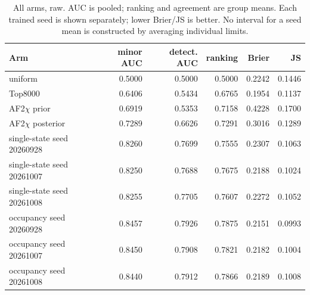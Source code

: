 \documentclass[10pt,a4paper]{article}
\begin{document}
\begin{table}[!htbp]
\centering
\caption{All arms, raw. AUC is pooled; ranking and agreement are group means. Each trained seed is shown separately; lower Brier/JS is better. No interval for a seed mean is constructed by averaging individual limits.}
\label{tab:afarmsraw}
\small\setlength{\tabcolsep}{4pt}
\begin{tabular}{@{}lrrrrr@{}}
\toprule
Arm & minor AUC & detect. AUC & ranking & Brier & JS \\
\midrule
uniform & 0.5000 & 0.5000 & 0.5000 & 0.2242 & 0.1446 \\
Top8000 & 0.6406 & 0.5434 & 0.6765 & 0.1954 & 0.1137 \\
AF2$\chi$ prior & 0.6919 & 0.5353 & 0.7158 & 0.4228 & 0.1700 \\
AF2$\chi$ posterior & 0.7289 & 0.6626 & 0.7291 & 0.3016 & 0.1289 \\
single-state seed 20260928 & 0.8260 & 0.7699 & 0.7555 & 0.2307 & 0.1063 \\
single-state seed 20261007 & 0.8250 & 0.7688 & 0.7675 & 0.2188 & 0.1024 \\
single-state seed 20261008 & 0.8255 & 0.7705 & 0.7607 & 0.2272 & 0.1052 \\
occupancy seed 20260928 & 0.8457 & 0.7926 & 0.7875 & 0.2151 & 0.0993 \\
occupancy seed 20261007 & 0.8450 & 0.7908 & 0.7821 & 0.2182 & 0.1004 \\
occupancy seed 20261008 & 0.8440 & 0.7912 & 0.7866 & 0.2189 & 0.1008 \\
\bottomrule
\end{tabular}
\end{table}
\end{document}
